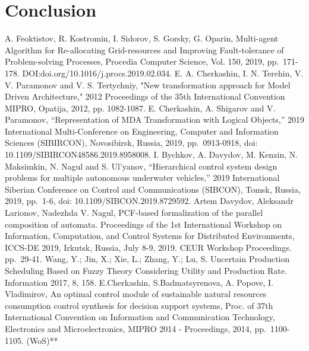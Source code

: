 \documentclass[runningheads]{llncs}
\begin{document}
\section*{Conclusion}
\label{sec:conc}



\begin{thebibliography}{999}
    \makeatletter
    \def\@biblabel#1{[#1]}
    \makeatother
     A. Feoktistov, R. Kostromin, I. Sidorov, S. Gorsky, G. Oparin, Multi-agent Algorithm for Re-allocating Grid-resources and Improving Fault-tolerance of Problem-solving Processes, Procedia Computer Science, Vol. 150, 2019, pp. 171-178. DOI:doi.org/10.1016/j.procs.2019.02.034.
     E. A. Cherkashin, I. N. Terehin, V. V. Paramonov and V. S. Tertychniy, "New transformation approach for Model Driven Architecture," 2012 Proceedings of the 35th International Convention MIPRO, Opatija, 2012, pp. 1082-1087.
     E. Cherkashin, A. Shigarov and V. Paramonov, “Representation of MDA Transformation with Logical Objects,” 2019 International Multi-Conference on Engineering, Computer and Information Sciences (SIBIRCON), Novosibirsk, Russia, 2019, pp. 0913-0918, doi: 10.1109/SIBIRCON48586.2019.8958008.
     I. Bychkov, A. Davydov, M. Kenzin, N. Maksimkin, N. Nagul and S. Ul’yanov, “Hierarchical control system design problems for multiple autonomous underwater vehicles,” 2019 International Siberian Conference on Control and Communications (SIBCON), Tomsk, Russia, 2019, pp. 1-6, doi: 10.1109/SIBCON.2019.8729592.
     Artem Davydov, Aleksandr Larionov, Nadezhda V. Nagul, PCF-based formalization of the parallel composition of automata. Proceedings of the 1st International Workshop on Information, Computation, and Control Systems for Distributed Environments, ICCS-DE 2019, Irkutsk, Russia, July 8-9, 2019. CEUR Workshop Proceedings. pp. 29-41.
     Wang, Y.; Jin, X.; Xie, L.; Zhang, Y.; Lu, S. Uncertain Production Scheduling Based on Fuzzy Theory Considering Utility and Production Rate. Information 2017, 8, 158.
     E.Cherkashin, S.Badmatsyrenova, A. Popove, I. Vladimirov, An optimal control module of sustainable natural resources consumption control synthesis for decision support systems, Proc. of 37th International Convention on Information and Communication Technology, Electronics and Microelectronics, MIPRO 2014 - Proceedings, 2014, pp. 1100-1105. (WoS)**


\end{thebibliography}
\end{document}
